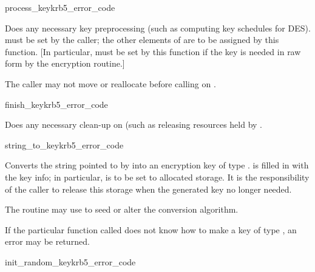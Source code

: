 
\begin{funcdecl}{process_key}{krb5_error_code}{\funcvoid}
\end{funcdecl}
Does any necessary key preprocessing (such as computing key
schedules for DES).
 must be set by the caller; the
other elements of  are to be assigned by this function.
[In particular,  must be set by this
function if the key is needed in raw form by the encryption routine.]

The caller may not move or reallocate  before calling
 on .


\begin{funcdecl}{finish_key}{krb5_error_code}{\funcvoid}
\end{funcdecl}
Does any necessary clean-up on  (such as releasing
resources held by .


\begin{funcdecl}{string_to_key}{krb5_error_code}{\funcvoid}
\end{funcdecl}
Converts the string pointed to by  into an encryption key
of type .   is filled in with
the key info; in particular,  is to
be set to allocated storage. It is the responsibility of the caller to
release this storage when the generated key no longer needed.

The routine may use  to seed or alter the conversion
algorithm.

If the particular function called does not know how to make a
key of type , an error may be returned.


\begin{funcdecl}{init_random_key}{krb5_error_code}{\funcvoid}
\end{funcdecl}

